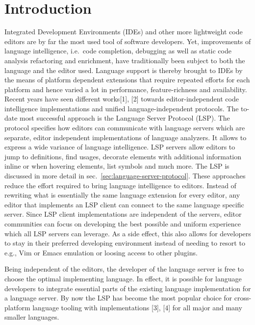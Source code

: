 \documentclass[
  a4paper,
  bibtex,
  english,
  nomenclature]{kthlatex/kththesis/kththesis}
\newcommand*\listoflistings{\listof{codelisting}{List of Listings}}
\begin{document}
\cleardoublepage
\listoflistings

\cleardoublepage

 \setcounter{page}{1}

\label{pg:lastPageofPreface} \mainmatter

\hypertarget{sec:introduction}{%
\chapter{Introduction}\label{sec:introduction}}

Integrated Development Environments (IDEs) and other more lightweight
code editors are by far the most used tool of software developers. Yet,
improvements of language intelligence, i.e.~code completion, debugging
as well as static code analysis refactoring and enrichment, have
traditionally been subject to both the language and the editor used.
Language support is thereby brought to IDEs by the means of platform
dependent extensions that require repeated efforts for each platform and
hence varied a lot in performance, feature-richness and availability.
Recent years have seen different works{[}1{]}, {[}2{]} towards
editor-independent code intelligence implementations and unified
language-independent protocols. The to-date most successful approach is
the Language Server Protocol (LSP). The protocol specifies how editors
can communicate with language servers which are separate, editor
independent implementations of language analyzers. It allows to express
a wide variance of language intelligence. LSP servers allow editors to
jump to definitions, find usages, decorate elements with additional
information inline or when hovering elements, list symbols and much
more. The LSP is discussed in more detail in
sec.~\ref{sec:language-server-protocol}. These approaches reduce the
effort required to bring language intelligence to editors. Instead of
rewriting what is essentially the same language extension for every
editor, any editor that implements an LSP client can connect to the same
language specific server. Since LSP client implementations are
independent of the servers, editor communities can focus on developing
the best possible and uniform experience which all LSP servers can
leverage. As a side effect, this also allows for developers to stay in
their preferred developing environment instead of needing to resort to
e.g., Vim or Emacs emulation or loosing access to other plugins.

Being independent of the editors, the developer of the language server
is free to choose the optimal implementing language. In effect, it is
possible for language developers to integrate essential parts of the
existing language implementation for a language server. By now the LSP
has become the most popular choice for cross-platform language tooling
with implementations {[}3{]}, {[}4{]} for all major and many smaller
languages.
\end{document}
